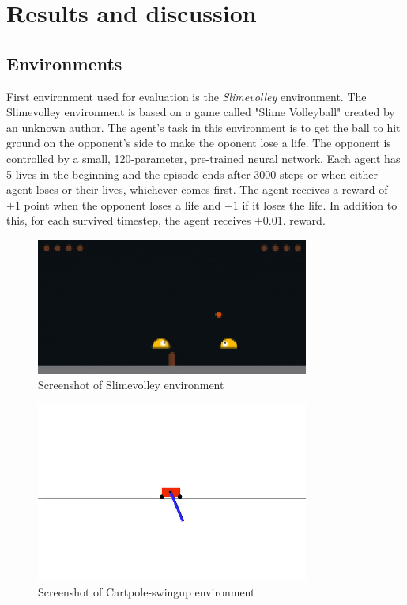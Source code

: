 \chapter{Results and discussion}
\section{Environments}

First environment used for evaluation is the \emph{Slimevolley} environment. The Slimevolley environment \cite{slimevolleygym} is based on a game called "Slime Volleyball" created by an unknown author. The agent's task in this environment is to get the ball to hit ground on the opponent's side to make the oponent lose a life. The opponent is controlled by a small, 120-parameter, pre-trained neural network. Each agent has 5 lives in the beginning and the episode ends after 3000 steps or when either agent loses or their lives, whichever comes first. The agent receives a reward of $+1$ point when the opponent loses a life and $-1$ if it loses the life. In addition to this, for each survived timestep, the agent receives $+0.01$.  reward.


\begin{figure}[h]
    \caption{Screenshot of Slimevolley environment}
    \includegraphics[width=0.8\textwidth]{img/slimevolley.png}
\end{figure}


\begin{figure}[h]
    \caption{Screenshot of Cartpole-swingup environment}
    \includegraphics[width=0.8\textwidth]{img/cartpole.png}
\end{figure}

